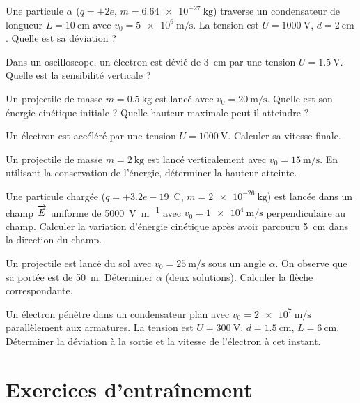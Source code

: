 \exo{} Une particule $\alpha$ ($q=+2e$, $m=\SI{6.64e-27}{\kilogram}$) traverse un condensateur de longueur $L=\SI{10}{\centi\metre}$ avec $v_0=\SI{5e6}{\metre\per\second}$. La tension est $U=\SI{1000}{\volt}$, $d=\SI{2}{\centi\metre}$. Quelle est sa déviation ?

\exo{} Dans un oscilloscope, un électron est dévié de \SI{3}{\centi\metre} par une tension $U=\SI{1.5}{\volt}$. Quelle est la sensibilité verticale ?


\exo{} Un projectile de masse $m=\SI{0.5}{\kilogram}$ est lancé avec $v_0=\SI{20}{\metre\per\second}$. Quelle est son énergie cinétique initiale ? Quelle hauteur maximale peut-il atteindre ?

\exo{} Un électron est accéléré par une tension $U=\SI{1000}{\volt}$. Calculer sa vitesse finale.

\exo{} Un projectile de masse $m=\SI{2}{\kilogram}$ est lancé verticalement avec $v_0=\SI{15}{\metre\per\second}$. En utilisant la conservation de l’énergie, déterminer la hauteur atteinte.

\exo{} Une particule chargée ($q=+3.2e-19$~C, $m=\SI{2e-26}{\kilogram}$) est lancée dans un champ $\overrightarrow{E}$ uniforme de \SI{5000}{\volt\per\metre} avec $v_0=\SI{1e4}{\metre\per\second}$ perpendiculaire au champ. Calculer la variation d’énergie cinétique après avoir parcouru \SI{5}{\centi\metre} dans la direction du champ.


\exo{} Un projectile est lancé du sol avec $v_0=\SI{25}{\metre\per\second}$ sous un angle $\alpha$. On observe que sa portée est de \SI{50}{\metre}. Déterminer $\alpha$ (deux solutions). Calculer la flèche correspondante.

\exo{} Un électron pénètre dans un condensateur plan avec $v_0=\SI{2e7}{\metre\per\second}$ parallèlement aux armatures. La tension est $U=\SI{300}{\volt}$, $d=\SI{1.5}{\centi\metre}$, $L=\SI{6}{\centi\metre}$. Déterminer la déviation à la sortie et la vitesse de l’électron à cet instant.

\section{Exercices d’entraînement}


